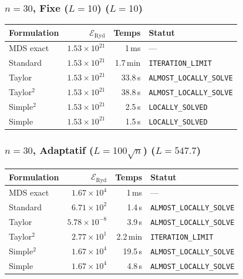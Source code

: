 \subsubsection{$n=30$, Fixe ($L{=}10$) ($L=10$)}
\begin{longtable}{@{}lrrl@{}}
  \toprule
  Formulation & $\mathcal{E}_{\mathrm{Ryd}}$ & Temps & Statut \\
  \midrule
  \endhead
  MDS exact & $1.53\times10^{21}$ & 1\,ms & --- \\
  Standard & $1.53\times10^{21}$ & 1.7\,min & \texttt{ITERATION\_LIMIT} \\
  Taylor & $1.53\times10^{21}$ & 33.8\,s & \texttt{ALMOST\_LOCALLY\_SOLVE} \\
  Taylor$^2$ & $1.53\times10^{21}$ & 38.8\,s & \texttt{ALMOST\_LOCALLY\_SOLVE} \\
  Simple$^2$ & $1.53\times10^{21}$ & 2.5\,s & \texttt{LOCALLY\_SOLVED} \\
  Simple & $1.53\times10^{21}$ & 1.5\,s & \texttt{LOCALLY\_SOLVED} \\
  \bottomrule
\end{longtable}

\subsubsection{$n=30$, Adaptatif ($L{=}100\sqrt{n}$) ($L=547.7$)}
\begin{longtable}{@{}lrrl@{}}
  \toprule
  Formulation & $\mathcal{E}_{\mathrm{Ryd}}$ & Temps & Statut \\
  \midrule
  \endhead
  MDS exact & $1.67\times10^{4}$ & 1\,ms & --- \\
  Standard & $6.71\times10^{2}$ & 1.4\,s & \texttt{ALMOST\_LOCALLY\_SOLVE} \\
  Taylor & $5.78\times10^{-8}$ & 3.9\,s & \texttt{ALMOST\_LOCALLY\_SOLVE} \\
  Taylor$^2$ & $2.77\times10^{1}$ & 2.2\,min & \texttt{ITERATION\_LIMIT} \\
  Simple$^2$ & $1.67\times10^{4}$ & 19.5\,s & \texttt{ALMOST\_LOCALLY\_SOLVE} \\
  Simple & $1.67\times10^{4}$ & 4.8\,s & \texttt{ALMOST\_LOCALLY\_SOLVE} \\
  \bottomrule
\end{longtable}

